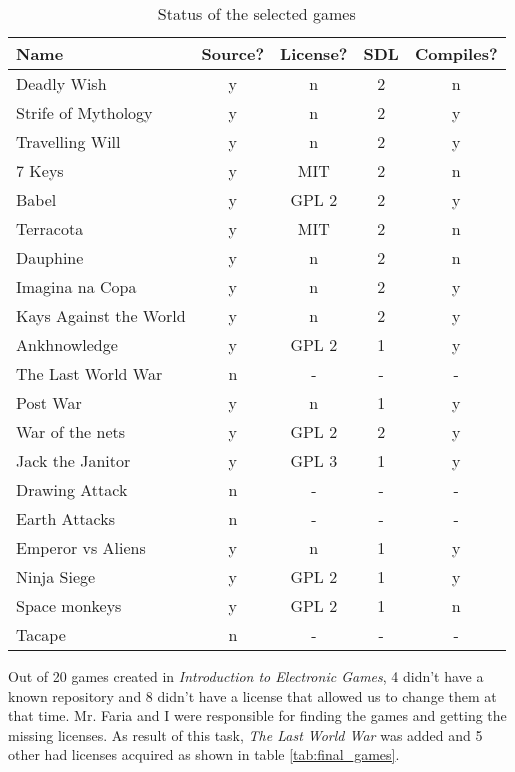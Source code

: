 \begin{table}[h!]
\centering
\caption{Status of the selected games}
\label{tab:first_games}
\begin{tabular}{lcccc}
\hline
\textbf{Name} & \textbf{Source?} & \textbf{License?} & \textbf{SDL} & \textbf{Compiles?} \\ \hline
Deadly Wish & y & n & 2 & n \\
Strife of Mythology & y & n & 2 & y \\
Travelling Will & y & n & 2 & y \\
7 Keys & y & MIT & 2 & n \\
Babel & y & GPL 2 & 2 & y \\
Terracota & y & MIT & 2 & n \\
Dauphine & y & n & 2 & n \\
Imagina na Copa & y & n & 2 & y \\
Kays Against the World & y & n & 2 & y \\
Ankhnowledge & y & GPL 2 & 1 & y \\
The Last World War & n & - & - & - \\
Post War & y & n & 1 & y \\
War of the nets & y & GPL 2 & 2 & y \\
Jack the Janitor & y & GPL 3 & 1 & y \\
Drawing Attack & n & - & - & - \\
Earth Attacks & n & - & - & - \\
Emperor vs Aliens & y & n & 1 & y \\
Ninja Siege & y & GPL 2 & 1 & y \\
Space monkeys & y & GPL 2 & 1 & n \\
Tacape & n & - & - & - \\ \hline
\end{tabular}
\end{table}

Out of 20 games created in \textit{Introduction to Electronic Games}, 4 didn't have a known repository and 8 didn't have a license that allowed us to change them at that time. Mr. Faria and I were responsible for finding the games and getting the missing licenses. As result of this task, \textit{The Last World War} was added and 5 other had licenses acquired as shown in table \ref{tab:final_games}.

